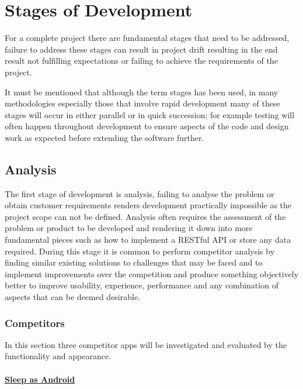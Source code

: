 \section{Stages of Development}\label{stages-of-development}

For a complete project there are fundamental stages that need to be
addressed, failure to address these stages can result in project drift
resulting in the end result not fulfilling expectations or failing to
achieve the requirements of the project.

It must be mentioned that although the term stages has been used, in
many methodologies especially those that involve rapid development many
of these stages will occur in either parallel or in quick succession;
for example testing will often happen throughout development to ensure
aspects of the code and design work as expected before extending the
software further.

\subsection{Analysis}\label{analysis}

The first stage of development is analysis, failing to analyse the
problem or obtain customer requirements renders development practically
impossible as the project scope can not be defined. Analysis often
requires the assessment of the problem or product to be developed and
rendering it down into more fundamental pieces such as how to implement
a RESTful API or store any data required. During this stage it is common
to perform competitor analysis by finding similar existing solutions to
challenges that may be faced and to implement improvements over the
competition and produce something objectively better to improve
usability, experience, performance and any combination of aspects that
can be deemed desirable.

\subsubsection{Competitors}\label{competitors}

In this section three competitor apps will be investigated and evaluated
by the functionality and appearance.

\paragraph{\texorpdfstring{\href{http://sleep.urbandroid.org/}{Sleep as
Android}}{Sleep as Android}}\label{sleep-as-android}

